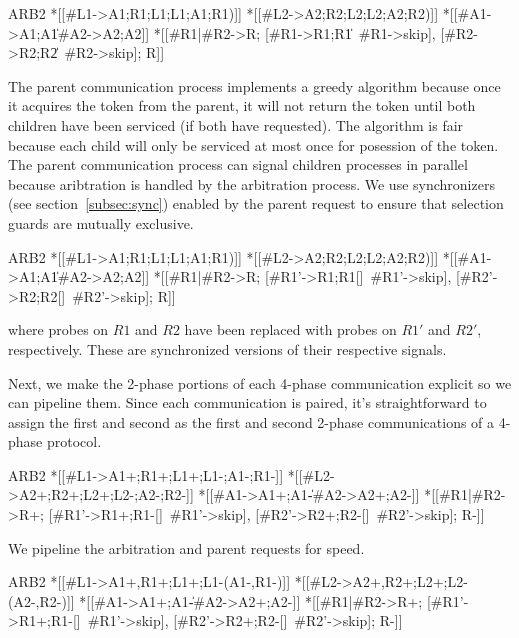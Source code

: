 \documentclass[aer.tex]{subfiles}
\begin{document}
\begin{csp}
ARB2\equiv
  *[[#{L1}->A1;R1;L1;L1;A1;R1)]] \pll
  *[[#{L2}->A2;R2;L2;L2;A2;R2)]] \pll
  *[[#{A1}->A1;A1\|#{A2}->A2;A2]]\pll
  *[[#{R1}|#{R2}->R;
    [#{R1}->R1;R1\|~#{R1}->skip],
    [#{R2}->R2;R2\|~#{R2}->skip];
    R]]
\end{csp}

The parent communication process implements a greedy algorithm because once it acquires the token from the parent,
it will not return the token until both children have been serviced (if both have requested). 
The algorithm is fair because each child will only be serviced at most once for posession of the token.
The parent communication process can signal children processes in parallel because aribtration is handled by the arbitration process.
We use synchronizers (see section~\ref{subsec:sync}) enabled by the parent request to ensure that selection guards are mutually exclusive.


\begin{csp}
ARB2\equiv
  *[[#{L1}->A1;R1;L1;L1;A1;R1)]] \pll
  *[[#{L2}->A2;R2;L2;L2;A2;R2)]] \pll
  *[[#{A1}->A1;A1\|#{A2}->A2;A2]]\pll
  *[[#{R1}|#{R2}->R;
    [#{R1'}->R1;R1[]~#{R1'}->skip],
    [#{R2'}->R2;R2[]~#{R2'}->skip];
    R]]
\end{csp}
where probes on $R1$ and $R2$ have been replaced with probes on $R1'$ and $R2'$, respectively. 
These are synchronized versions of their respective signals.

Next, we make the 2-phase portions of each 4-phase communication explicit so we can pipeline them.
Since each communication is paired, it's straightforward to assign the first and second as the first and second
2-phase communications of a 4-phase protocol. 

\begin{csp}
ARB2\equiv
  *[[#{L1}->A1+;R1+;L1+;L1-;A1-;R1-]] \pll
  *[[#{L2}->A2+;R2+;L2+;L2-;A2-;R2-]] \pll
  *[[#{A1}->A1+;A1-\|#{A2}->A2+;A2-]]\pll
  *[[#{R1}|#{R2}->R+;
    [#{R1'}->R1+;R1-[]~#{R1'}->skip],
    [#{R2'}->R2+;R2-[]~#{R2'}->skip];
    R-]]
\end{csp}

We pipeline the arbitration and parent requests for speed.

\begin{csp}
ARB2\equiv
  *[[#{L1}->A1+,R1+;L1+;L1-\star(A1-,R1-)]] \pll
  *[[#{L2}->A2+,R2+;L2+;L2-\star(A2-,R2-)]] \pll
  *[[#{A1}->A1+;A1-\|#{A2}->A2+;A2-]]\pll
  *[[#{R1}|#{R2}->R+;
    [#{R1'}->R1+;R1-[]~#{R1'}->skip],
    [#{R2'}->R2+;R2-[]~#{R2'}->skip];
    R-]]
\end{csp}
\end{document}
